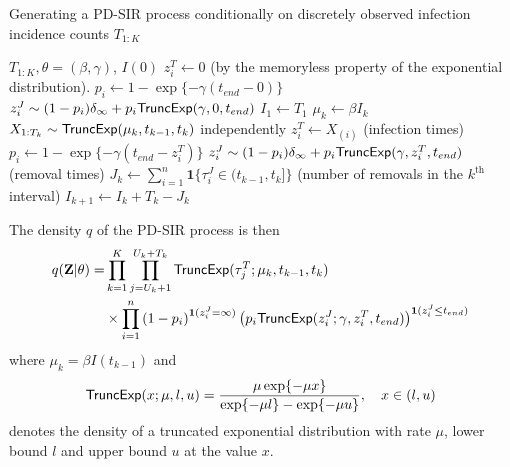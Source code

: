 \documentclass[11pt]{article}
\begin{document}
	\begin{algorithm}
		\caption{Generating a PD-SIR process conditionally on discretely observed infection incidence counts $T_{1:K}$}
		\label{alg:PD-SIR}
		\begin{algorithmic}
			\REQUIRE $T_{1:K}, \theta = (\beta, \gamma)$, $I(0)$
			\STATE $z^T_i \leftarrow 0$ (by the memoryless property of the exponential distribution).
			\STATE $p_i \leftarrow 1 - \exp\{-\gamma (t_{end} - 0)\}$
			\STATE $z^J_i \sim (1 - p_i) \delta_\infty + p_i \textsf{TruncExp}(\gamma, 0, t_{end})$
			\ENDFOR
			\STATE $I_1 \leftarrow T_1$
			\STATE $\mu_k \leftarrow \beta I_k$
			\STATE $X_{1 : T_k} \sim \textsf{TruncExp}(\mu_k, t_{k-1}, t_k)$ independently
			\STATE $z^T_i \leftarrow X_{(i)}$ (infection times)
			\STATE $p_i \leftarrow 1 - \exp\{-\gamma(t_{end} - z^T_i)\}$
			\STATE $z^J_i \sim (1 - p_i) \delta_\infty + p_i \textsf{TruncExp}(\gamma, z^T_i, t_{end})$ (removal times)
			\ENDFOR
			\STATE $J_k \leftarrow \sum_{i=1}^n \mathbf{1}\{\tau^J_i \in (t_{k-1}, t_k]\}$ (number of removals in the $k^{\text{th}}$ interval)
			\STATE $I_{k+1} \leftarrow I_k + T_k - J_k$
			\ENDFOR
		\end{algorithmic}
	\end{algorithm}
				
	The density $q$ of the PD-SIR process is then
	\begin{align*}
		q(\mathbf{Z}|\theta) =
		& \prod_{k=1}^K \prod_{j=U_k + 1}^{U_k + T_k} \textsf{TruncExp}(\tau^T_j; \mu_{k}, t_{k-1}, t_{k}) \\
		& \times \prod_{i=1}^{n} \left( 1 - p_i \right)^{\mathbf{1}(z^J_i = \infty)} \left( p_i \textsf{TruncExp}(z^J_i; \gamma, z^T_i, t_{end}) \right)^{\mathbf{1}(z^J_i \le t_{end})}
	\end{align*}
	where $\mu_k = \beta I(t_{k-1})$ and
	$$\textsf{TruncExp}(x; \mu, l, u) = \dfrac{\mu \exp\{-\mu x\}}{\exp\{-\mu l\} - \exp\{-\mu u\}}, \quad x \in (l, u)$$
	denotes the density of a truncated exponential distribution with rate $\mu$, lower bound $l$ and upper bound $u$ at the value $x$. 
				
\end{document}
